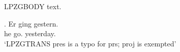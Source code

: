

LPZGBODY text.

\exg. Er ging gestern.\\ he go. yesterday.\\
\glt `LPZGTRANS pres is a typo for prs; proj is exempted'

